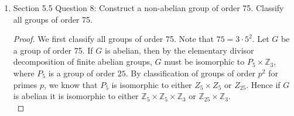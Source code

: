\documentclass{article}
\begin{document}
\begin{enumerate}[label={\bf Q\arabic*:}]
\begin{proof}
      If $K$ is finite, we pick $b$ differently as follows: Let $|K|=n$
      and $|\varphi_1(K)|=|\varphi_2(K)|=m$. By Lagrange's theorem, $m|n$.
      Since $\varphi_1(g)=(\sigma^{-1}\varphi_2(g)\sigma)^a$ is a generator
      of $\varphi_1(K)$, $\sigma^{-1}\varphi_2(g)\sigma$ must also generate
      $\varphi_1(K)$, and so $(a,m)=1$. Now $(a,m)=1$ and $m|n$ implies
      that there exists some $\overline{a}\in\mathbb{N}$ such that
      $(\overline{a},n)=1$ and $\overline{a}\equiv a\mod{n}$. Let
      $b\in\mathbb{N}$ be such that $\overline{a}b\equiv1\mod{n}$. Then for
      every $k\in K$, we will have $k^{ab}=1$. \\

      Hence defining $\Theta$ to send $(h,k)$ to $(\sigma^{-1}(h),k^b)$
      will satisfy $\Psi\circ\Theta=\Theta\circ\Psi=\text{id}$, as
      required.
    \end{proof}

  \item Section 5.5 Question 8: Construct a non-abelian group of order 75.
    Classify all groups of order 75.

    \begin{proof}
      We first classify all groups of order 75. Note that $75=3\cdot5^2$.
      Let $G$ be a group of order 75. If $G$ is abelian, then by the
      elementary divisor decomposition of finite abelian groups, $G$ must
      be isomorphic to $P_5\times\mathbb{Z}_3$, where $P_5$ is a group of
      order $25$. By classification of groups of order $p^2$ for primes
      $p$, we know that $P_5$ is isomorphic to either $Z_5\times Z_5$ or
      $Z_{25}$. Hence if $G$ is abelian it is isomorphic to either
      $\mathbb{Z}_5\times\mathbb{Z}_5\times\mathbb{Z}_3$ or
      $\mathbb{Z}_{25}\times\mathbb{Z}_3$. \\


\end{proof}
\end{enumerate}
\end{document}
